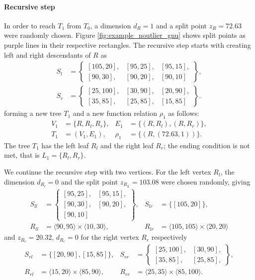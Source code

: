 \paragraph{Recursive step} 
In order to reach $T_1$ from $T_0$, a dimension $d_R=1$ and a split point $z_R = 72.63$ were randomly chosen. Figure \ref{fig:example_noutlier_gnu} shows split points as purple lines in their respective rectangles. The recursive step starts with creating left and right descendants of $R$ as
\begin{align*}
S_l &= \left\{\begin{smallmatrix}
 [105,20],& [95,25], &[95,15],\\
[90,30],&[90,20],&[90,10]
\end{smallmatrix}\right\}, \\
S_r &= \left\{\begin{smallmatrix}
    [25,100],&[30,90],&[20,90],\\
    [35,85], &[25,85],&[15,85]
\end{smallmatrix}\right\}.
\end{align*}
forming a new tree $T_1$ and a new function relation $\rho_1$ as follows:
\begin{align*}
V_1 &= \{R, R_l, R_r\},&
E_1 &= \{(R,R_l), (R,R_r)\},\\
T_1 &= (V_1, E_1),&
\rho_1 &= \{ (R, (72.63, 1))\}.
\end{align*}
The tree $T_1$ has the left leaf $R_l$ and the right leaf $R_r$; the ending condition is not met, that is $L_1 = \{R_l,R_r\}$. 

We continue the recursive step with two vertices.
For the left vertex $R_l$, the dimension $d_{R_l} =0$ and the split point $z_{R_L}= 103.08$ were chosen randomly, giving
\begin{align*}
S_{ll} &= \left\{\begin{smallmatrix}
    [95,25],& [95,15],\\ 
    [90,30],&[90,20],\\
    [90,10]
\end{smallmatrix}\right\},&
S_{lr} &= \{[105,20]\},\\
R_{ll} &= \langle 90, 95 \rangle \times \langle 10, 30\rangle,&
R_{lr} &= \langle 105, 105 \rangle \times \langle 20, 20\rangle
\end{align*}
and $z_{R_r}= 20.32$, $d_{R_r} = 0$ for the right vertex $R_r$ respectively
\begin{align*}
S_{rl}&= \{[20,90],[15,85]\},&
S_{rr} &= \left\{\begin{smallmatrix}
    [25, 100],& [30,90],\\
    [35,85],& [25,85],
\end{smallmatrix}\right\},\\
R_{rl}&= \langle 15, 20 \rangle \times \langle 85, 90 \rangle,&
R_{rr}&= \langle 25, 35 \rangle \times \langle 85, 100 \rangle.
\end{align*}

